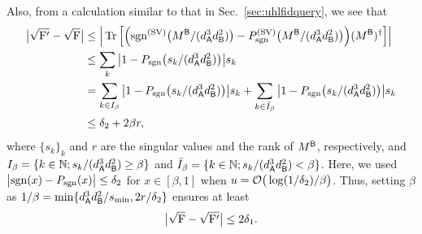 Also, from a calculation similar to that in Sec.~\ref{sec:uhlfidquery}, we see that
\begin{align}
    \big|\sqrt{{\mathrm{F}}'} - \sqrt{{\mathrm{F}}}\big| 
    &\leq \Big|\operatorname{Tr}\Big[\Big(\mathrm{sgn}^{(\rm SV)}\big(M^{\mathsf{B}}/(d_{\mathsf{A}}^3 d_{\mathsf{B}}^2)\big) - P_{\mathrm{sgn}}^{(\rm SV)}\big(M^{\mathsf{B}}/(d_{\mathsf{A}}^3 d_{\mathsf{B}}^2)\big)\Big)(M^{{\mathsf{B}}})^\dag\Big]\Big| \\
    &\leq \sum_k \big|1 - P_{\mathrm{sgn}}\big(s_k/(d_{\mathsf{A}}^3 d_{\mathsf{B}}^2)\big)\big|s_k \\
    &= \sum_{k\in I_\beta} \big|1 - P_{\mathrm{sgn}}\big(s_k/(d_{\mathsf{A}}^3 d_{\mathsf{B}}^2)\big)\big|s_k + \sum_{k\in \bar{I}_\beta} \big|1 - P_{\mathrm{sgn}}\big(s_k/(d_{\mathsf{A}}^3 d_{\mathsf{B}}^2)\big)\big|s_k \\
    &\leq \delta_2 + 2\beta r,
\end{align}
where $\{s_k\}_k$ and $r$ are the singular values and the rank of $M^{\mathsf{B}}$, respectively, and $I_\beta = \{k \in \mathbb{N}; s_k/(d_{\mathsf{A}}^3 d_{\mathsf{B}}^2) \geq \beta\}$ and $\bar{I}_\beta = \{k \in \mathbb{N}; s_k/(d_{\mathsf{A}}^3 d_{\mathsf{B}}^2) < \beta\}$.
Here, we used $\big|\mathrm{sgn}(x) - P_{\mathrm{sgn}}(x)\big| \leq \delta_2$ for $x \in [\beta, 1]$ when $u={\mathcal{O}}\big(\log(1/\delta_2)/\beta\big)$.
Thus, setting $\beta$ as $1/\beta = \min\{d_{\mathsf{A}}^3 d_{\mathsf{B}}^2/s_{\rm min}, 2r/\delta_2\}$ ensures at least 
\begin{align}
\label{inteq:126}
    \big|\sqrt{{\mathrm{F}}} - \sqrt{{\mathrm{F}}'}\big| \leq 2\delta_1.
\end{align}

